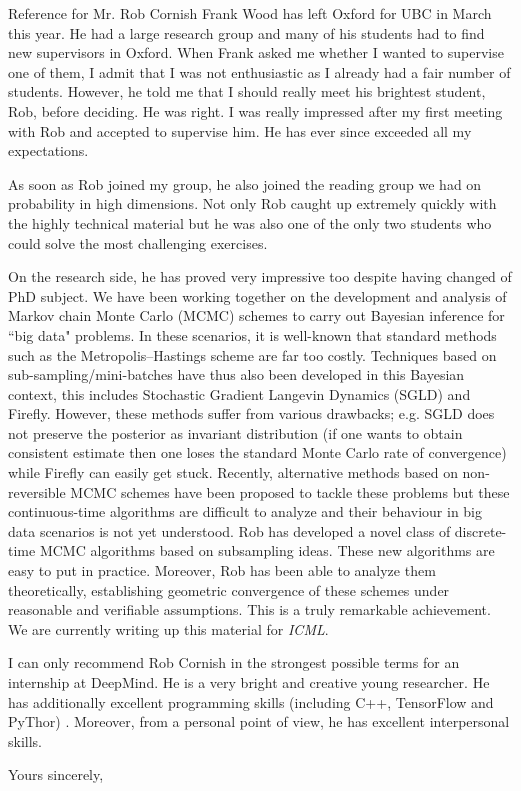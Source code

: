 \documentclass{letter}
\begin{document}
\begin{letter}{Reference for Mr. Rob Cornish}
\bigskip
Frank Wood has left Oxford for UBC in March this year. He had a large research group and many of his students had to find new supervisors in Oxford.
When Frank asked me whether I wanted to supervise one of them, I admit that I was not enthusiastic as I already had a fair number of students.
However, he told me that I should really meet his brightest student, Rob, before deciding. He was right. I was really impressed after my first meeting with Rob and accepted to supervise him. He has ever since exceeded all my expectations.

\newpage
As soon as Rob joined my group, he also joined the reading group we had on probability in high dimensions. Not only Rob caught up extremely quickly with the highly technical material but he was also one of the only two students who could solve the most challenging exercises.

\bigskip
On the research side, he has proved very impressive too despite having changed of PhD subject. We have been working together on the development and analysis of Markov chain Monte Carlo (MCMC) schemes to carry out Bayesian inference for ``big data" problems. In these scenarios, it is well-known that standard methods such as the Metropolis--Hastings scheme are far too costly. Techniques based on sub-sampling/mini-batches have thus also been developed in this Bayesian context, this includes Stochastic Gradient Langevin Dynamics (SGLD) and Firefly. However, these methods suffer from various drawbacks; e.g. SGLD does not preserve the posterior as invariant distribution (if one wants to obtain consistent estimate then one loses the standard Monte Carlo rate of convergence) while Firefly can easily get stuck. Recently, alternative methods based on non-reversible MCMC schemes have been proposed to tackle these problems but these continuous-time algorithms are difficult to analyze and their behaviour in big data scenarios is not yet understood. Rob has developed a novel class of discrete-time MCMC algorithms based on subsampling ideas. These new algorithms are easy to put in practice. Moreover, Rob has been able to analyze them theoretically, establishing geometric convergence of these schemes under reasonable and verifiable assumptions. This is a truly remarkable achievement. We are currently writing up this material for \emph{ICML}.



\bigskip
I can only recommend Rob Cornish in the strongest possible terms for an internship at DeepMind. He is a very bright and creative young researcher. He has additionally excellent programming skills (including C++, TensorFlow and PyThor) . Moreover, from a personal point of view, he has excellent interpersonal skills.

\closing{ Yours sincerely,\\
 \\
}

\end{letter}
\end{document}

